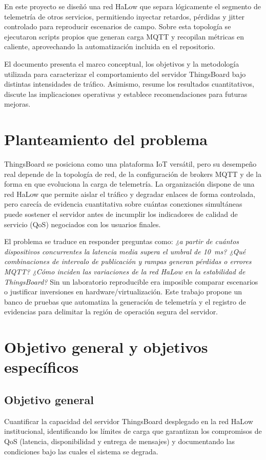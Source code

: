 ﻿\documentclass[conference]{IEEEtran}
\begin{document}
En este proyecto se dise\~n\'o una red HaLow que separa l\'ogicamente el segmento de telemetr\'ia de otros servicios, permitiendo inyectar retardos, p\'erdidas y jitter controlado para reproducir escenarios de campo. Sobre esta topolog\'ia se ejecutaron scripts propios que generan carga MQTT y recopilan m\'etricas en caliente, aprovechando la automatizaci\'on incluida en el repositorio.

El documento presenta el marco conceptual, los objetivos y la metodolog\'ia utilizada para caracterizar el comportamiento del servidor ThingsBoard bajo distintas intensidades de tr\'afico. Asimismo, resume los resultados cuantitativos, discute las implicaciones operativas y establece recomendaciones para futuras mejoras.

\section{Planteamiento del problema}
ThingsBoard se posiciona como una plataforma IoT vers\'atil, pero su desempe\~no real depende de la topolog\'ia de red, de la configuraci\'on de brokers MQTT y de la forma en que evoluciona la carga de telemetr\'ia. La organizaci\'on dispone de una red HaLow que permite aislar el tr\'afico y degradar enlaces de forma controlada, pero carec\'ia de evidencia cuantitativa sobre cu\'antas conexiones simult\'aneas puede sostener el servidor antes de incumplir los indicadores de calidad de servicio (QoS) negociados con los usuarios finales.

El problema se traduce en responder preguntas como: \textit{¿a partir de cu\'antos dispositivos concurrentes la latencia media supera el umbral de \SI{10}{\milli\second}? ¿Qu\'e combinaciones de intervalo de publicaci\'on y rampas generan p\'erdidas o errores MQTT? ¿C\'omo inciden las variaciones de la red HaLow en la estabilidad de ThingsBoard?} Sin un laboratorio reproducible era imposible comparar escenarios o justificar inversiones en hardware/virtualizaci\'on. Este trabajo propone un banco de pruebas que automatiza la generaci\'on de telemetr\'ia y el registro de evidencias para delimitar la regi\'on de operaci\'on segura del servidor.

\section{Objetivo general y objetivos espec\'ificos}
\subsection{Objetivo general}
Cuantificar la capacidad del servidor ThingsBoard desplegado en la red HaLow institucional, identificando los l\'imites de carga que garantizan los compromisos de QoS (latencia, disponibilidad y entrega de mensajes) y documentando las condiciones bajo las cuales el sistema se degrada.
\end{document}

